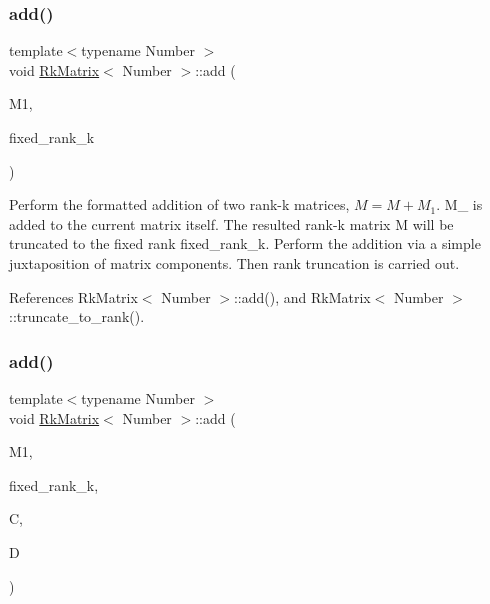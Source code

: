 \subsubsection{\texorpdfstring{add()}{add()}\hspace{0.1cm}{\footnotesize\ttfamily [9/12]}}
{\footnotesize\ttfamily template$<$typename Number $>$ \\
void \hyperlink{classRkMatrix}{Rk\+Matrix}$<$ Number $>$\+::add (\begin{DoxyParamCaption}\item[{const \hyperlink{classRkMatrix}{Rk\+Matrix}$<$ Number $>$ \&}]{M1,  }\item[{const \hyperlink{classRkMatrix_add060bfc3a4cc77f858c3d6dd58cadd5}{size\+\_\+type}}]{fixed\+\_\+rank\+\_\+k }\end{DoxyParamCaption})}

Perform the formatted addition of two rank-\/k matrices, $M = M + M_1$. {\ttfamily M\+\_} is added to the current matrix itself. The resulted rank-\/k matrix {\ttfamily M} will be truncated to the fixed rank {\ttfamily fixed\+\_\+rank\+\_\+k}. Perform the addition via a simple juxtaposition of matrix components. Then rank truncation is carried out.

References Rk\+Matrix$<$ Number $>$\+::add(), and Rk\+Matrix$<$ Number $>$\+::truncate\+\_\+to\+\_\+rank().

\mbox{\label{classRkMatrix_a344f63dbe69f2858ed39a8731cc3beba}} 
\subsubsection{\texorpdfstring{add()}{add()}\hspace{0.1cm}{\footnotesize\ttfamily [10/12]}}
{\footnotesize\ttfamily template$<$typename Number $>$ \\
void \hyperlink{classRkMatrix}{Rk\+Matrix}$<$ Number $>$\+::add (\begin{DoxyParamCaption}\item[{const \hyperlink{classRkMatrix}{Rk\+Matrix}$<$ Number $>$ \&}]{M1,  }\item[{const \hyperlink{classRkMatrix_add060bfc3a4cc77f858c3d6dd58cadd5}{size\+\_\+type}}]{fixed\+\_\+rank\+\_\+k,  }\item[{\hyperlink{classLAPACKFullMatrixExt}{L\+A\+P\+A\+C\+K\+Full\+Matrix\+Ext}$<$ Number $>$ \&}]{C,  }\item[{\hyperlink{classLAPACKFullMatrixExt}{L\+A\+P\+A\+C\+K\+Full\+Matrix\+Ext}$<$ Number $>$ \&}]{D }\end{DoxyParamCaption})}

